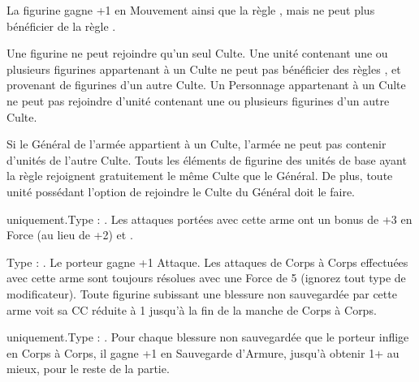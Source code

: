 \begin{multicols}{2}
\begin{center}
La figurine gagne +1 en Mouvement ainsi que la règle \strider{}, mais ne peut plus bénéficier de la règle \killerinstinct{}.
\end{center}
\end{multicols}

\armyspecialruleentry{\cultrivalry}

Une figurine ne peut rejoindre qu'un seul Culte. Une unité contenant une ou plusieurs figurines appartenant à un Culte ne peut pas bénéficier des règles \holdyourground{}, \inspiringpresence{} et \divineblessings{} provenant de figurines d'un autre Culte. Un Personnage appartenant à un Culte ne peut pas rejoindre d'unité contenant une ou plusieurs figurines d'un autre Culte.

\armyspecialruleentry{\cultistgeneral}

Si le Général de l'armée appartient à un Culte, l'armée ne peut pas contenir d'unités de l'autre Culte. Touts les éléments de figurine des unités de base ayant la règle \killerinstinct{} rejoignent gratuitement le même Culte que le Général. De plus, toute unité possédant l'option de rejoindre le Culte du Général doit le faire.

\closearmynewsection

\startarmymagicalitems

\armymagicalweapons

\startpricelist

\infantry{} uniquement.\newline Type : \gw{}. Les attaques portées avec cette arme ont un bonus de +3 en Force (au lieu de +2) et .

Type : \hw{}. Le porteur gagne +1 Attaque. Les attaques de Corps à Corps effectuées avec cette arme sont toujours résolues avec une Force de 5 (ignorez tout type de modificateur). Toute figurine subissant une blessure non sauvegardée par cette arme voit sa CC réduite à 1 jusqu'à la fin de la manche de Corps à Corps.

\endpricelist

\armymagicalarmour

\startpricelist

\infantry{} uniquement.\newline Type : \ha{}. Pour chaque blessure non sauvegardée que le porteur inflige en Corps à Corps, il gagne +1 en Sauvegarde d'Armure, jusqu'à obtenir 1+ au mieux, pour le reste de la partie.

